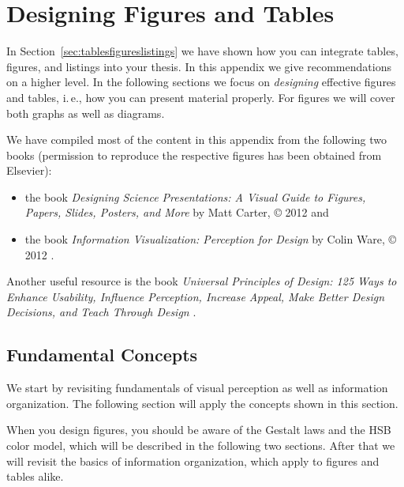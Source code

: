  
\chapter{Designing Figures and Tables}
\label{cha:designingfigtab}
\label{appendixb}

In Section~\ref{sec:tablesfigureslistings} we have shown how you can integrate tables, figures, and listings into your thesis. In this appendix we give recommendations on a higher level. In the following sections we focus on \emph{designing} effective figures and tables, i.\,e., how you can present material properly. For figures we will cover both graphs as well as diagrams.

We
have compiled most of the content in this appendix from the following two books (permission to reproduce the respective figures has been obtained from Elsevier):
\begin{itemize}
  \item the book \emph{Designing Science Presentations: A Visual Guide to Figures, Papers, Slides, Posters, and More} by Matt Carter, © 2012 \cite{Carter12} and
  \item the book \emph{Information Visualization: Perception for Design} by Colin Ware, © 2012 \cite{Ware12}.
\end{itemize}

Another useful resource is the book \emph{Universal Principles of Design: 125 Ways to Enhance Usability, Influence Perception, Increase Appeal, Make Better Design Decisions, and Teach Through Design} \cite{Lidwell10}.
  
\section{Fundamental Concepts}

We start by revisiting fundamentals of visual perception as well as information organization. The following section will apply the concepts shown in this section.

When you design figures, you should be aware of the Gestalt laws and the HSB color model, which will be described in the following two sections. After that we will revisit the basics of information organization, which apply to figures and tables alike.

